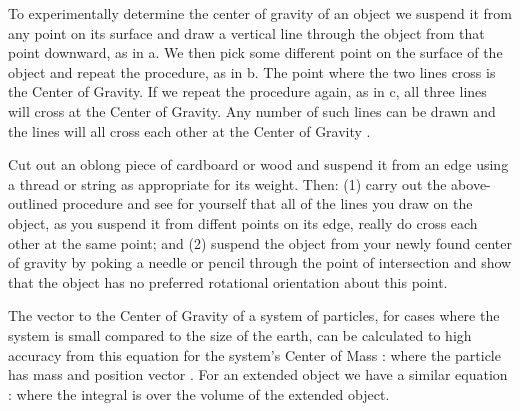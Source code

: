 {

To experimentally determine the center of gravity of an object we suspend it from any point on
its surface and draw a vertical line through the object from that point downward, as in a.
We then pick some different point on the surface of the object and repeat the procedure, as
in b.
The point where the two lines cross is the Center of Gravity.
If we repeat the procedure again, as in c, all three lines will cross at the Center of Gravity.
Any number of such lines can be drawn and the lines will all cross each other at the Center of Gravity
.

\tryit Cut out an oblong piece of cardboard or wood and suspend it from an edge using a thread or
string as appropriate for its weight.
Then: (1) carry out the above-outlined procedure and see for yourself that all of the lines you draw on
the object, as you suspend it from diffent points on its edge, really do cross each other at the
same point; and (2) suspend the object from your newly found center of gravity by poking a needle
or pencil through the point of intersection and show that the object has no preferred rotational
orientation about this point.

The vector to the Center of Gravity of a system of  particles, for cases where the system is small
compared to the size of the earth, can be calculated to high accuracy from this equation for the
system's Center of Mass :
%
%
where the  particle has mass  and position vector .
For an extended object we have a similar equation :
%
%
where the integral is over the volume of the extended object.
%
}%


